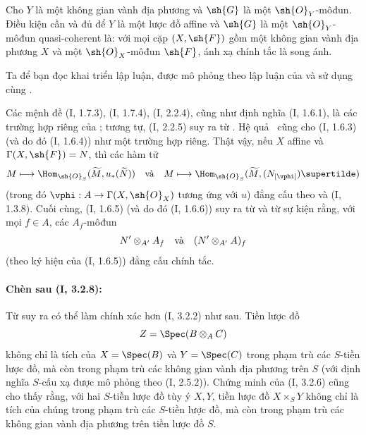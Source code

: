 \documentclass[oneside,10pt]{amsart}
\makeatletter
\newcommand{\ega@arrow}[2]{\mathchoice{#1}{#2}{#2}{#2}}
\renewcommand{\to}{\ega@arrow{\longrightarrow}{\rightarrow}}
\let\EGAOriginalLabel\label
\renewcommand{\label}[1]{\phantomsection\EGAOriginalLabel{#1}}
\makeatother
\begin{document}
\begin{corollary}[1.8.10]
\label{ega2:addendum:I.1.8.10}
Cho $Y$ là một không gian vành địa phương và $\sh{G}$ là một
$\sh{O}_Y$-môđun. Điều kiện cần và đủ để $Y$ là một lược đồ affine và
$\sh{G}$ là một $\sh{O}_Y$-môđun quasi-coherent là: với mọi cặp
$(X,\sh{F})$ gồm một không gian vành địa phương $X$ và một
$\sh{O}_X$-môđun $\sh{F}$, ánh xạ chính tắc  là song
ánh.
\end{corollary}

Ta để bạn đọc khai triển lập luận, được mô phỏng theo lập luận của
 và sử dụng  cùng .

\begin{remark}[1.8.11]
\label{ega2:addendum:I.1.8.11}
Các mệnh đề (I, 1.7.3), (I, 1.7.4), (I, 2.2.4), cũng như định nghĩa
(I, 1.6.1), là các trường hợp riêng của ; tương tự,
(I, 2.2.5) suy ra từ . Hệ quả~ cũng cho
(I, 1.6.3) (và do đó (I, 1.6.4)) như một trường hợp riêng. Thật vậy,
nếu $X$ affine và $\Gamma(X,\sh{F})=N$, thì các hàm tử
\[
  M\longmapsto
  \Hom_{\sh{O}_S}(\widetilde M,u_*(\widetilde N))
  \quad\hbox{và}\quad
  M\longmapsto
  \Hom_{\sh{O}_S}(\widetilde M,(N_{[\vphi]})\supertilde)
\]
(trong đó $\vphi:A\to\Gamma(X,\sh{O}_X)$ tương ứng với $u$) đẳng cấu
theo  và (I, 1.3.8). Cuối cùng, (I, 1.6.5) (và do đó
(I, 1.6.6)) suy ra từ  và từ sự kiện rằng, với mọi
$f\in A$, các $A_f$-môđun
\[
  N'\otimes_{A'}A_f
  \quad\hbox{và}\quad
  (N'\otimes_{A'}A)_f
\]
(theo ký hiệu của (I, 1.6.5)) đẳng cấu chính tắc.
\end{remark}

\paragraph{Chèn sau (I, 3.2.8):}

\begin{env}[3.2.9]
\label{ega2:addendum:I.3.2.9}
Từ  suy ra có thể làm chính xác hơn (I, 3.2.2) như sau.
Tiền lược đồ
\[
  Z=\Spec(B\otimes_A C)
\]
không chỉ là tích của $X=\Spec(B)$ và $Y=\Spec(C)$ trong phạm trù các
$S$-tiền lược đồ, mà còn trong phạm trù các không gian vành địa
phương trên $S$ (với định nghĩa $S$-cấu xạ được mô phỏng theo
(I, 2.5.2)). Chứng minh của (I, 3.2.6) cũng cho thấy rằng, với hai
$S$-tiền lược đồ tùy ý $X,Y$, tiền lược đồ $X\times_S Y$ không chỉ là
tích của chúng trong phạm trù các $S$-tiền lược đồ, mà còn trong phạm
trù các không gian vành địa phương trên tiền lược đồ $S$.
\end{env}
\end{document}
